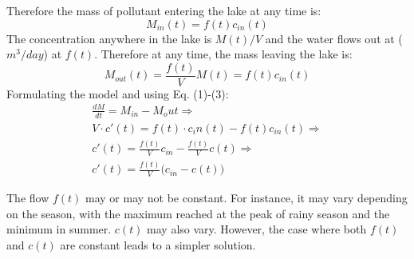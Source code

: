 \documentclass[a4paper]{article}
\begin{document}
Therefore the mass of pollutant entering the lake at any time is:
\[
M_{in}(t) = f(t)c_{in}(t)
\tag{2}
\]
The concentration anywhere in the lake is $M(t)/V$ and the water flows out at ($m^3/day$) at $f(t)$. Therefore at any time, the mass leaving the lake is:
\[
M_{out}(t) = \frac{f(t)}{V}M(t) = f(t)c_{in}(t)
\tag{3}
\]
Formulating the model and using Eq. (1)-(3):
\begin{gather*}
    \frac{dM}{dt} = M_{in} - M_out  \Rightarrow \\
    V\cdot c'(t) = f(t)\cdot c_in(t) -  f(t)c_{in}(t) \Rightarrow \\
    c'(t)  = \frac{f(t)}{V}c_{in} - \frac{f(t)}{V}c(t) \Rightarrow  \\
    c'(t) = \frac{f(t)}{V}\big(c_{in} - c(t) \big) \label{eq:ode_lake_as_in_cooling} \tag{4}
\end{gather*}

The flow $f(t)$ may or may not be constant. For instance, it may vary depending on the season, with the maximum reached at the peak of rainy season and the minimum in summer. $c(t)$ may also vary. However, the case where both $f(t)$ and $c(t)$ are constant leads to a simpler solution.
\end{document}
